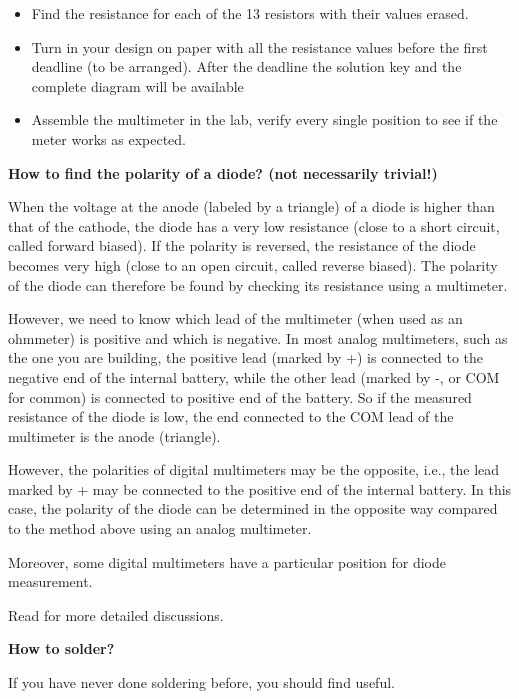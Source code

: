 \begin{itemize}
  \item Find the resistance for each of the 13 resistors with their values 
    erased.

  \item Turn in your design on paper with all the resistance values before
    the first deadline (to be arranged). After the deadline the solution key
    and the complete diagram will be available 

  \item Assemble the multimeter in the lab, verify every single position 
    to see if the meter works as expected.
    
\end{itemize}

{\bf How to find the polarity of a diode? (not necessarily trivial!)}

When the voltage at the anode (labeled by a triangle) of a diode is higher
than that of the cathode, the diode has a very low resistance (close to a short
circuit, called forward biased). If the polarity is reversed, the resistance 
of the diode becomes very high (close to an open circuit, called reverse biased).
The polarity of the diode can therefore be found by checking its resistance 
using a multimeter.

However, we need to know which lead of the multimeter (when used as an ohmmeter) 
is positive and which is negative. In most analog multimeters, such as the one 
you are building, the positive lead (marked by +) is connected to the negative 
end of the internal battery, while the other lead (marked by -, or COM for common)
is connected to positive end of the battery. So if the measured resistance of the 
diode is low, the end connected to the COM lead of the multimeter is the anode
(triangle).

However, the polarities of digital multimeters may be the opposite, i.e., the 
lead marked by + may be connected to the positive end of the internal battery.
In this case, the polarity of the diode can be determined in the opposite way
compared to the method above using an analog multimeter. 

Moreover, some digital multimeters have a particular position for diode measurement. 

Read 
for more detailed discussions.

{\bf How to solder?} 

If you have never done soldering before, you should find 
useful.




	

	

